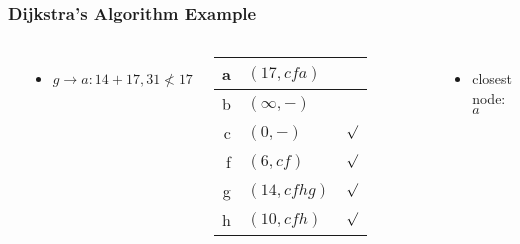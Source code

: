 \documentclass[dvipsnames]{beamer}
\begin{document}
\begin{frame}
  \frametitle{Dijkstra's Algorithm Example}

  \begin{example}[from node $g$ - base distance=$14$]
    \begin{columns}
      \begin{center}
      \end{center}

      \begin{itemize}
        \item $g \rightarrow a: 14+17, 31 \nless 17$
      \end{itemize}

      \pause
      \begin{table}
        \begin{tabular}{r|l|c}
          a & $(17,cfa)$   & \\\hline
          b & $(\infty,-)$ & \\\hline
          c & $(0,-)$      & $\surd$ \\\hline
          f & $(6,cf)$     & $\surd$ \\\hline
          g & $(14,cfhg)$  & $\surd$ \\\hline
          h & $(10,cfh)$   & $\surd$
        \end{tabular}
      \end{table}

      \pause
      \begin{itemize}
        \item closest node: $a$
      \end{itemize}
    \end{columns}
  \end{example}
\end{frame}
\end{document}

